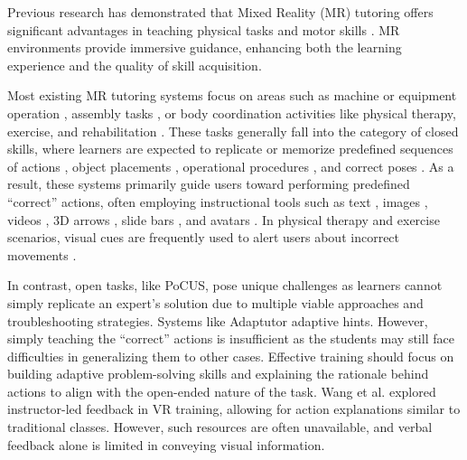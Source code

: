 Previous research has demonstrated that Mixed Reality (MR) tutoring offers significant advantages in teaching physical tasks and motor skills \cite{wang2020capturar, huang2021adaptutar, cao2022mobiletutar, chidambaram2022editar, liu2023instrumentar, ipsita2022welding}. MR environments provide immersive guidance, enhancing both the learning experience and the quality of skill acquisition.

Most existing MR tutoring systems focus on areas such as machine or equipment operation \cite{cao2022mobiletutar, chidambaram2021processar, huang2021adaptutar, ipsita2022welding, liu2023instrumentar}, assembly tasks \cite{whitlock2020authar, yamaguchi2020video}, or body coordination activities like physical therapy, exercise, and rehabilitation \cite{anderson2013youmove, faridan2023chameleoncontrol, monteiro2023teachable, semeraro2022visualizing}. These tasks generally fall into the category of closed skills, where learners are expected to replicate or memorize predefined sequences of actions \cite{cao2022mobiletutar, chidambaram2021processar, huang2021adaptutar, ipsita2022welding, liu2023instrumentar}, object placements \cite{ipsita2022welding, whitlock2020authar, yamaguchi2020video}, operational procedures \cite{huang2021adaptutar, ipsita2022welding}, and correct poses \cite{anderson2013youmove, semeraro2022visualizing}. As a result, these systems primarily guide users toward performing predefined ``correct'' actions, often employing instructional tools such as text \cite{whitlock2020authar}, images \cite{anderson2013youmove, cao2020exploratory, chidambaram2021processar}, videos \cite{ipsita2022welding}, 3D arrows \cite{cao2020exploratory, liu2023instrumentar, chidambaram2021processar}, slide bars \cite{liu2023instrumentar, ipsita2022welding}, and avatars \cite{cao2020exploratory, huang2021adaptutar}. In physical therapy and exercise scenarios, visual cues are frequently used to alert users about incorrect movements \cite{anderson2013youmove, faridan2023chameleoncontrol, monteiro2023teachable, semeraro2022visualizing}. 

In contrast, open tasks, like PoCUS, pose unique challenges as learners cannot simply replicate an expert’s solution due to multiple viable approaches and troubleshooting strategies. Systems like Adaptutor \cite{huang2021adaptutar} adaptive hints. However, simply teaching the ``correct'' actions is insufficient as the students may still face difficulties in generalizing them to other cases. Effective training should focus on building adaptive problem-solving skills and explaining the rationale behind actions to align with the open-ended nature of the task. Wang et al. \cite{Wang2023MGPAM} explored instructor-led feedback in VR training, allowing for action explanations similar to traditional classes. However, such resources are often unavailable, and verbal feedback alone is limited in conveying visual information.

